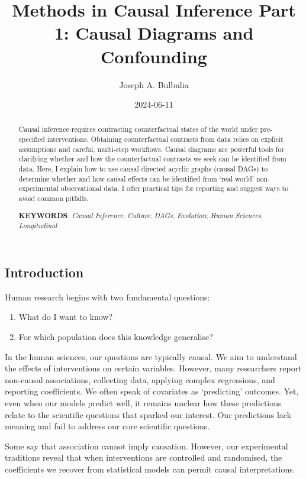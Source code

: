 \documentclass[
  single column]{article}
\title{Methods in Causal Inference Part 1: Causal Diagrams and
Confounding}
\author{Joseph A. Bulbulia}
\affil{%
             \small{     Victoria University of Wellington, New Zealand
          ORCID \textcolor[HTML]{A6CE39}{\aiOrcid} ~0000-0002-5861-2056 }
              }
\date{2024-06-11}
\providecommand{\tightlist}{%
  \setlength{\itemsep}{0pt}\setlength{\parskip}{0pt}}\usepackage{longtable,booktabs,array}
\begin{document}
\maketitle
\begin{abstract}
Causal inference requires contrasting counterfactual states of the world
under pre-specified interventions. Obtaining counterfactual contrasts
from data relies on explicit assumptions and careful, multi-step
workflows. Causal diagrams are powerful tools for clarifying whether and
how the counterfactual contrasts we seek can be identified from data.
Here, I explain how to use causal directed acyclic graphs (causal DAGs)
to determine whether and how causal effects can be identified from
`real-world' non-experimental observational data. I offer practical tips
for reporting and suggest ways to avoid common pitfalls.

\textbf{KEYWORDS}: \emph{Causal Inference}; \emph{Culture}; \emph{DAGs};
\emph{Evolution}; \emph{Human Sciences}; \emph{Longitudinal}
\end{abstract}

\subsection{Introduction}\label{id-sec-introduction}

Human research begins with two fundamental questions:

\begin{enumerate}
\def\labelenumi{\arabic{enumi}.}
\tightlist
\item
  What do I want to know?
\item
  For which population does this knowledge generalise?
\end{enumerate}

In the human sciences, our questions are typically causal. We aim to
understand the effects of interventions on certain variables. However,
many researchers report non-causal associations, collecting data,
applying complex regressions, and reporting coefficients. We often speak
of covariates as `predicting' outcomes. Yet, even when our models
predict well, it remains unclear how these predictions relate to the
scientific questions that sparked our interest. Our predictions lack
meaning and fail to address our core scientific questions.

Some say that association cannot imply causation. However, our
experimental traditions reveal that when interventions are controlled
and randomised, the coefficients we recover from statistical models can
permit causal interpretations.
\end{document}
